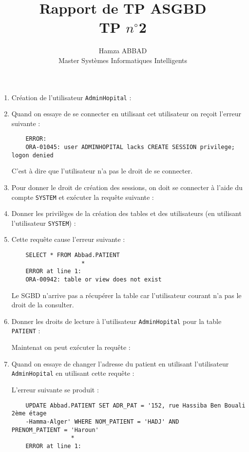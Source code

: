 \documentclass[12pt,a4paper]{article}
\author{Hamza ABBAD\\ Master Systèmes Informatiques Intelligents}
\title{\textbf{Rapport de TP ASGBD} \\ TP $n^{\circ}$2}
\begin{document}
\maketitle
\begin{enumerate}
	\item Création de l'utilisateur \texttt{AdminHopital} :
	
	\item Quand on essaye de se connecter en utilisant cet utilisateur on reçoit l'erreur suivante :
	\begin{verbatim}
	ERROR:
	ORA-01045: user ADMINHOPITAL lacks CREATE SESSION privilege; logon denied
	\end{verbatim}
	C'est à dire que l'utilisateur n'a pas le droit de se connecter.
	\item Pour donner le droit de création des sessions, on doit se connecter à l'aide du compte \texttt{SYSTEM}
	et exécuter la requête suivante :
	
	\item Donner les privilèges de la création des tables et des utilisateurs (en utilisant l'utilisateur \texttt{SYSTEM}) :
	
	\item Cette requête cause l'erreur suivante :
	\begin{verbatim}
	SELECT * FROM Abbad.PATIENT
                    *
	ERROR at line 1:
	ORA-00942: table or view does not exist
	\end{verbatim}
	Le SGBD n'arrive pas a récupérer la table car l'utilisateur courant n'a pas le droit de la consulter.
	\item Donner les droits de lecture à l'utilisateur \texttt{AdminHopital} pour la table \texttt{PATIENT} :
	
	Maintenat on peut exécuter la requête :
	
	\item Quand on essaye de changer l'adresse du patient en utilisant l'utilisateur \texttt{AdminHopital}
	en utilisant cette requête :
	
	L'erreur suivante se produit :
	\begin{verbatim}
	UPDATE Abbad.PATIENT SET ADR_PAT = '152, rue Hassiba Ben Bouali 2ème étage 
	-Hamma-Alger' WHERE NOM_PATIENT = 'HADJ' AND 		PRENOM_PATIENT = 'Haroun'
    	         *
	ERROR at line 1:

\end{verbatim}
\end{enumerate}
\end{document}
